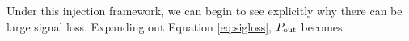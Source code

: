 \documentclass[preprint2,numberedappendix,tighten]{aastex6}  %
\newcommand{\phat}{\widehat{\mathbf{p}}}
\newcommand{\cc}[1]{{\color{purple} \textbf{[CC: #1]}}}
\begin{document}


Under this injection framework, we can begin to see explicitly why there can be large signal loss. Expanding out Equation \eqref{eq:sigloss}, $P_{\rm out}$ becomes:
\end{document}
